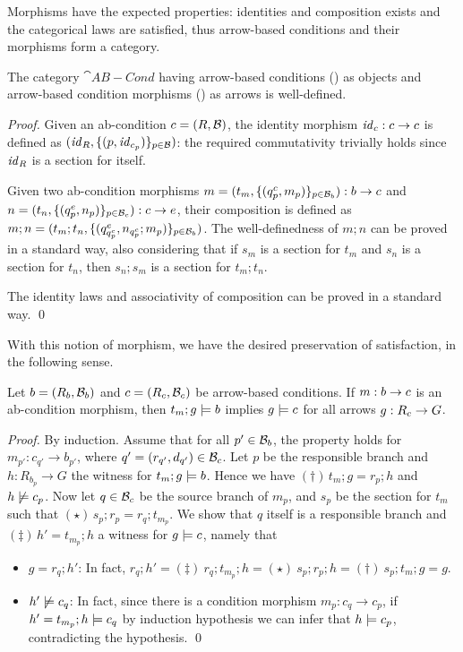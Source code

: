 \medskip\noindent Morphisms have the expected properties: identities and composition exists and the categorical laws are satisfied, thus arrow-based conditions and their morphisms form a category.
%

\begin{proposition}
  The category $\cat{AB-Cond}$ having arrow-based conditions () as objects and arrow-based condition morphisms () as arrows is well-defined.
\end{proposition}
 
\begin{proof}
  Given an ab-condition $c=(R,\mathcal{B})$, the identity morphism $\mathit{id}_c:c\rightarrow c$ is defined as $(\mathit{id}_R,\{{(p,\mathit{id}_{c_p})}\}_{p\in \mathcal{B}})$: the required commutativity trivially holds since $\mathit{id}_R$ is a section for itself.
  
Given two ab-condition morphisms $m= (t_m,\{{(q^c_p,m_p)}\}_{p\in \mathcal{B}_b}):b\rightarrow c$ and $n = (t_n,\{{(q^e_p,n_p)}\}_{p\in \mathcal{B}_c}):c\rightarrow e$, their composition is defined as $m;n=(t_m;t_n,\{{(q^e_{q^c_p},n_{q^c_p};m_p)}\}_{p\in \mathcal{B}_b})$.
The well-definedness of $m;n$ can be proved in a standard way, also considering that if $s_m$ is a section for $t_m$ and $s_n$ is a section for $t_n$, then $s_n;s_m$ is a section for $t_m;t_n$.

The identity laws and associativity of composition can be proved in a standard way. \qed
\end{proof}

With this notion of morphism, we have the desired preservation of satisfaction, in the following sense.

\begin{proposition}
Let $b = (R_b, \mathcal{B}_b)$ and $c = (R_c, \mathcal{B}_c)$  be arrow-based conditions. If $m:b\rightarrow c$ is an ab-condition morphism, then $t_m;g\models b$ implies $g \models c$ for all arrows $g:R_c\rightarrow G$.
\end{proposition}
%
\emph{Proof.} By induction. Assume that for all $p'\in \mathcal{B}_b$, the property holds for $m_{p'}:c_{q'} \to b_{p'}$, where $q' = (r_{q'}, d_{q'}) \in \mathcal{B}_c$. Let $p$ be the responsible branch and $h: R_{b_{p}} \to G$ the witness for $t_m;g\models b$. 
Hence we have $(\dagger)\, t_m; g=r_{p};h$ and $h \not\models c_p$.  Now let $q \in \mathcal{B}_c$ be the source branch of $m_{p}$, and $s_p$ be the section for $t_m$ such that $(\star)\, s_p;r_p = r_q; t_{m_p}$. 
We show that $q$ itself is a responsible branch and $(\ddagger)\, h'=t_{m_p};h$ a witness for $g\models c$, namely that 
\begin{itemize}
\item $g = r_q;h'$: In fact, $r_q;h' =\!(\ddagger)\ r_q;t_{m_p};h =\!(\star)\ s_p;r_p; h  =\!(\dagger)\ s_p;t_m;g = g$. 
\item $h' \not\models c_q$: In fact, since there is a condition morphism $m_{p}: c_q \to c_p$, if $h'= t_{m_p};h \models c_q$ by induction hypothesis we can infer that $h \models c_p$, contradicting the hypothesis. \qed
\end{itemize}

